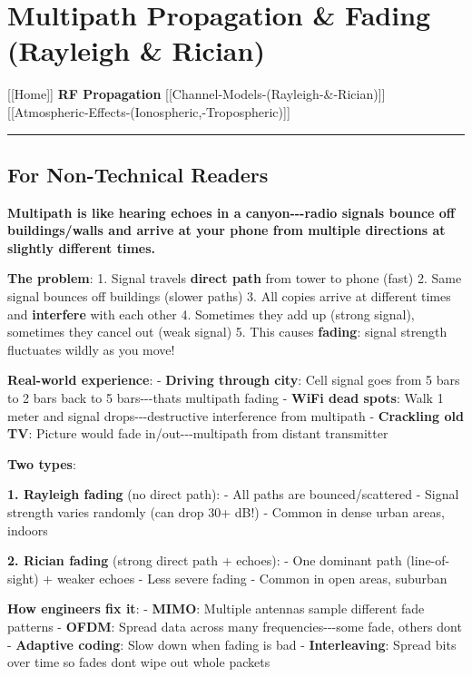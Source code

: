 \section{Multipath Propagation \& Fading (Rayleigh \&
Rician)}\label{multipath-propagation-fading-rayleigh-rician}

{[}{[}Home{]}{]} \textbar{} \textbf{RF Propagation} \textbar{}
{[}{[}Channel-Models-(Rayleigh-\&-Rician){]}{]} \textbar{}
{[}{[}Atmospheric-Effects-(Ionospheric,-Tropospheric){]}{]}

\begin{center}\rule{0.5\linewidth}{0.5pt}\end{center}

\subsection{\texorpdfstring{ For Non-Technical
Readers}{ For Non-Technical Readers}}\label{for-non-technical-readers}

\textbf{Multipath is like hearing echoes in a canyon-\/-\/-radio signals
bounce off buildings/walls and arrive at your phone from multiple
directions at slightly different times.}

\textbf{The problem}: 1. Signal travels \textbf{direct path} from tower
to phone (fast) 2. Same signal bounces off buildings (slower paths) 3.
All copies arrive at different times and \textbf{interfere} with each
other 4. Sometimes they add up (strong signal), sometimes they cancel
out (weak signal) 5. This causes \textbf{fading}: signal strength
fluctuates wildly as you move!

\textbf{Real-world experience}: - \textbf{Driving through city}: Cell
signal goes from 5 bars to 2 bars back to 5
bars-\/-\/-that\textquotesingle s multipath fading - \textbf{WiFi dead
spots}: Walk 1 meter and signal drops-\/-\/-destructive interference
from multipath - \textbf{Crackling old TV}: Picture would fade
in/out-\/-\/-multipath from distant transmitter

\textbf{Two types}:

\textbf{1. Rayleigh fading} (no direct path): - All paths are
bounced/scattered - Signal strength varies randomly (can drop 30+ dB!) -
Common in dense urban areas, indoors

\textbf{2. Rician fading} (strong direct path + echoes): - One dominant
path (line-of-sight) + weaker echoes - Less severe fading - Common in
open areas, suburban

\textbf{How engineers fix it}: - \textbf{MIMO}: Multiple antennas sample
different fade patterns - \textbf{OFDM}: Spread data across many
frequencies-\/-\/-some fade, others don\textquotesingle t -
\textbf{Adaptive coding}: Slow down when fading is bad -
\textbf{Interleaving}: Spread bits over time so fades
don\textquotesingle t wipe out whole packets

